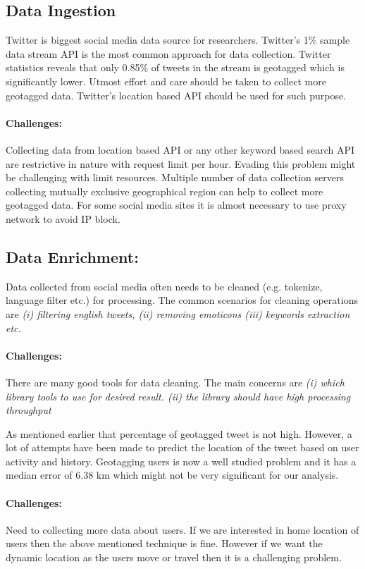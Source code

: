 \subsection{Data Ingestion}
Twitter is biggest social media data source for researchers. Twitter's 1\% sample data stream API is the most common approach for data collection. Twitter statistics reveals that only 0.85\% of tweets in the stream is geotagged \cite{sloan2013knowing} which is significantly lower. Utmost effort and care should be taken to collect more geotagged data. Twitter's location based API should be used for such purpose.

\paragraph{Challenges:}
Collecting data from location based API or any other keyword based search API are restrictive in nature with request limit per hour.
Evading this problem might be challenging with limit resources. Multiple number of data collection servers collecting mutually exclusive geographical region can help to collect more geotagged data. For some social media sites it is almost necessary to use proxy network to avoid IP block.

\subsection{Data Enrichment:}
Data collected from social media often needs to be cleaned (e.g. tokenize, language filter etc.) for processing. The common scenarios for cleaning operations are {\em(i) filtering english tweets, (ii) removing emoticons (iii) keywords extraction etc. }

\paragraph{Challenges:} There are many good tools for data cleaning. The main concerns are {\em(i) which library tools to use for desired result. (ii) the library should have high processing throughput}

As mentioned earlier that percentage of geotagged tweet is not high. However, a lot of attempts have been made to predict the location of the tweet based on user activity and history.  Geotagging users is now a well studied problem and it has a median error of 6.38 km which might not be very significant for our analysis\cite{compton2014geotagging}.

\paragraph{Challenges:}
Need to collecting more data about users. If we are interested in home location of users then the above mentioned \cite{compton2014geotagging} technique is fine. However if we want the dynamic location as the users move or travel then it is a challenging problem.



